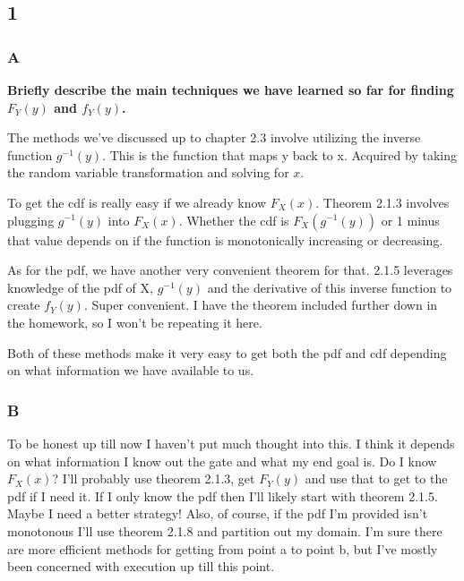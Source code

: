 \subsection*{1}

\subsubsection*{A}

\textbf{Briefly describe the main techniques we have learned so far for finding $F_Y(y)$ and $f_Y(y)$.}

The methods we've discussed up to chapter 2.3 involve utilizing the inverse function $g^{-1}(y)$. This is the function that maps y back to x. Acquired by taking the random variable transformation and solving for $x$. 

To get the cdf is really easy if we already know $F_X(x)$. Theorem 2.1.3 involves plugging $g^{-1}(y)$ into $F_X(x)$. Whether the cdf is $F_X(g^{-1}(y))$ or 1 minus that value depends on if the function is monotonically increasing or decreasing. 

As for the pdf, we have another very convenient theorem for that. 2.1.5 leverages knowledge of the pdf of X, $g^{-1}(y)$ and the derivative of this inverse function to create $f_Y(y)$. Super convenient. I have the theorem included further down in the homework, so I won't be repeating it here.

Both of these methods make it very easy to get both the pdf and cdf depending on what information we have available to us.

\subsubsection*{B}

To be honest up till now I haven't put much thought into this. I think it depends on what information I know out the gate and what my end goal is. Do I know $F_X(x)$? I'll probably use theorem 2.1.3, get $F_Y(y)$ and use that to get to the pdf if I need it. If I only know the pdf then I'll likely start with theorem 2.1.5. Maybe I need a better strategy! Also, of course, if the pdf I'm provided isn't monotonous I'll use theorem 2.1.8 and partition out my domain. I'm sure there are more efficient methods for getting from point a to point b, but I've mostly been concerned with execution up till this point.
